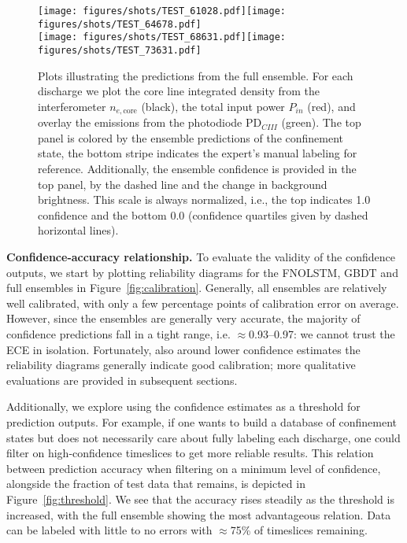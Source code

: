 \begin{figure*}[t]
\begin{center}\texttt{[image: figures/shots/TEST\_61028.pdf]}\texttt{[image: figures/shots/TEST\_64678.pdf]}\\\texttt{[image: figures/shots/TEST\_68631.pdf]}\texttt{[image: figures/shots/TEST\_73631.pdf]}\end{center}
    \caption{Plots illustrating the predictions from the full ensemble. For each discharge we plot the core line integrated density from the interferometer $n_{e,\text{core}}$ (black), the total input power $P_{\textit{in}}$ (red), and overlay the emissions from the photodiode $\text{PD}_{\textit{CIII}}^{}$ (green). The top panel is colored by the ensemble predictions of the confinement state, the bottom stripe indicates the expert's manual labeling for reference. Additionally, the ensemble confidence is provided in the top panel, by the dashed line and the change in background brightness. This scale is always normalized, i.e., the top indicates 1.0 confidence and the bottom 0.0 (confidence quartiles given by dashed horizontal lines).}
    \label{fig:s_test}%
\end{figure*}

\textbf{Confidence-accuracy relationship.} To evaluate the validity of the confidence outputs, we start by plotting reliability diagrams for the FNOLSTM, GBDT and full ensembles in Figure~\ref{fig:calibration}. Generally, all ensembles are relatively well calibrated, with only a few percentage points of calibration error on average. However, since the ensembles are generally very accurate, the majority of confidence predictions fall in a tight range, i.e. $\approx$\numrange{0.93}{0.97}: we cannot trust the ECE in isolation. Fortunately, also around lower confidence estimates the reliability diagrams generally indicate good calibration; more qualitative evaluations are provided in subsequent sections.

Additionally, we explore using the confidence estimates as a threshold for prediction outputs. For example, if one wants to build a database of confinement states but does not necessarily care about fully labeling each discharge, one could filter on high-confidence timeslices to get more reliable results. This relation between prediction accuracy when filtering on a minimum level of confidence, alongside the fraction of test data that remains, is depicted in Figure~\ref{fig:threshold}. We see that the accuracy rises steadily as the threshold is increased, with the full ensemble showing the most advantageous relation. Data can be labeled with little to no errors with $\approx$75\% of timeslices remaining.

